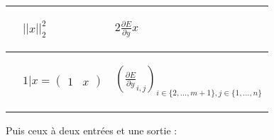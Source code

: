 \begin{center}
\begin{tabular}{|m{3.5cm}|m{2.7cm}|m{4.5cm}|}
\hline
\begin{center}\end{center} & \begin{center}$||x||_2^2$\end{center} & \begin{center}$2\frac{\partial E}{\partial y}x$\end{center} \\ 
\hline
\begin{center}\end{center} & \begin{center}$1|x = \begin{pmatrix}1 & x\end{pmatrix}$\end{center} & \begin{center}$(\frac{\partial E}{\partial y}_{i, j})_{i \in \{2, ..., m+1\}, j \in \{1, ..., n\}}$\end{center} \\ 
\hline
\end{tabular}
\end{center}

Puis ceux à deux entrées et une sortie :

